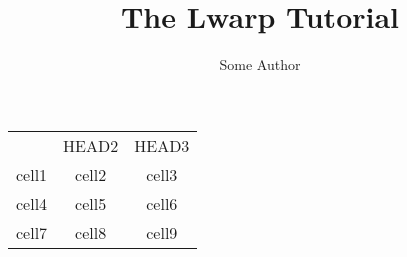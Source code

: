\documentclass{book}
\title{The Lwarp Tutorial}
\author{Some Author}
\begin{document}

\begingroup
\tracingall
\begin{center}
  \begin{tabular}{ c c c }
    \headrow{HEAD1 & HEAD2 & HEAD3}\\ 
    cell1 & cell2 & cell3 \\ 
    cell4 & cell5 & cell6 \\  
    cell7 & cell8 & cell9    
  \end{tabular}
\end{center}
\endgroup
\end{document}
